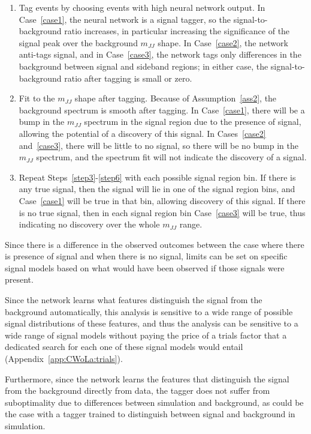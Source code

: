 \begin{enumerate}
  \label{step4}
  \item Tag events by choosing events with high neural network output.
    In Case~\ref{case1}, the neural network is a signal tagger, so the signal-to-background ratio increases, in particular increasing the significance of the signal peak over the background $m_{JJ}$ shape. 
    In Case~\ref{case2}, the network anti-tags signal, and in Case~\ref{case3}, the network tags only differences in the background between signal and sideband regions; in either case, the signal-to-background ratio after tagging is small or zero.
  \label{step5}
  \item Fit to the $m_{JJ}$ shape after tagging.
    Because of Assumption~\ref{ass2}, the background spectrum is smooth after tagging.
    In Case~\ref{case1}, there will be a bump in the $m_{JJ}$ spectrum in the signal region due to the presence of signal, allowing the potential of a discovery of this signal.
    In Cases~\ref{case2} and~\ref{case3}, there will be little to no signal, so there will be no bump in the $m_{JJ}$ spectrum, and the spectrum fit will not indicate the discovery of a signal.
    \label{step6}
  \item Repeat Steps~\ref{step3}-\ref{step6} with each possible signal region bin.
    If there is any true signal, then the signal will lie in one of the signal region bins, and Case~\ref{case1} will be true in that bin, allowing discovery of this signal.
    If there is no true signal, then in each signal region bin Case~\ref{case3} will be true, thus indicating no discovery over the whole $m_{JJ}$ range.
\end{enumerate}
Since there is a difference in the observed outcomes between the case where there is presence of signal and when there is no signal, limits can be set on specific signal models based on what would have been observed if those signals were present.

Since the network learns what features distinguish the signal from the background automatically, this analysis is sensitive to a wide range of possible signal distributions of these features, and thus the analysis can be sensitive to a wide range of signal models without paying the price of a trials factor that a dedicated search for each one of these signal models would entail (Appendix~\ref{app:CWoLa:trials}).

Furthermore, since the network learns the features that distinguish the signal from the background directly from data, the tagger does not suffer from suboptimality due to differences between simulation and background, as could be the case with a tagger trained to distinguish between signal and background in simulation.

